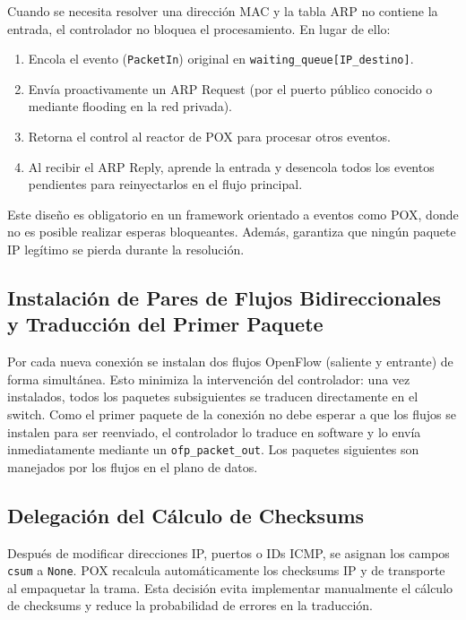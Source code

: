 \documentclass[11pt, a4paper]{article}
\begin{document}
Cuando se necesita resolver una dirección MAC y la tabla ARP no contiene la entrada, el controlador no bloquea el procesamiento. En lugar de ello:
\begin{enumerate}
    \item Encola el evento (\texttt{PacketIn}) original en \texttt{waiting\_queue[IP\_destino]}.
    \item Envía proactivamente un ARP Request (por el puerto público conocido o mediante flooding en la red privada).
    \item Retorna el control al reactor de POX para procesar otros eventos.
    \item Al recibir el ARP Reply, aprende la entrada y desencola todos los eventos pendientes para reinyectarlos en el flujo principal.
\end{enumerate}
Este diseño es obligatorio en un framework orientado a eventos como POX, donde no es posible realizar esperas bloqueantes. Además, garantiza que ningún paquete IP legítimo se pierda durante la resolución.

\subsection{Instalación de Pares de Flujos Bidireccionales y Traducción del Primer Paquete}
\label{subsec:flujos_pares}

Por cada nueva conexión se instalan dos flujos OpenFlow (saliente y entrante) de forma simultánea. Esto minimiza la intervención del controlador: una vez instalados, todos los paquetes subsiguientes se traducen directamente en el switch. Como el primer paquete de la conexión no debe esperar a que los flujos se instalen para ser reenviado, el controlador lo traduce en software y lo envía inmediatamente mediante un \texttt{ofp\_packet\_out}. Los paquetes siguientes son manejados por los flujos en el plano de datos.

\subsection{Delegación del Cálculo de Checksums}
\label{subsec:checksums}

Después de modificar direcciones IP, puertos o IDs ICMP, se asignan los campos \texttt{csum} a \texttt{None}. POX recalcula automáticamente los checksums IP y de transporte al empaquetar la trama. Esta decisión evita implementar manualmente el cálculo de checksums y reduce la probabilidad de errores en la traducción.
\end{document}

